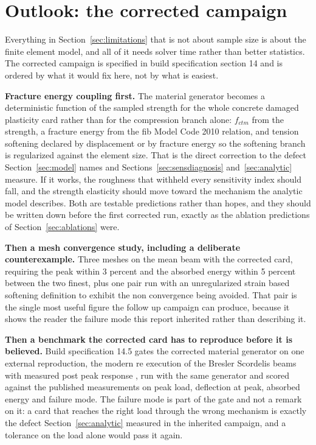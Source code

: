 \documentclass[11pt,a4paper]{article}
\begin{document}
\section{Outlook: the corrected campaign}
\label{sec:outlook}
Everything in Section~\ref{sec:limitations} that is not about sample size is about the finite
element model, and all of it needs solver time rather than better statistics. The corrected
campaign is specified in build specification section 14 and is ordered by what it would fix
here, not by what is easiest.

\textbf{Fracture energy coupling first.} The material generator becomes a deterministic function
of the sampled strength for the whole concrete damaged plasticity card rather than for the
compression branch alone: $f_{ctm}$ from the strength, a fracture energy from the fib Model Code
2010 relation, and tension softening declared by displacement or by fracture energy so the
softening branch is regularized against the element size. That is the direct correction to the
defect Section~\ref{sec:model} names and Sections~\ref{sec:sensdiagnosis}
and~\ref{sec:analytic} measure. If it works, the roughness that withheld every sensitivity index
should fall, and the strength elasticity should move toward the mechanism the analytic model
describes. Both are testable predictions rather than hopes, and they should be written down
before the first corrected run, exactly as the ablation predictions of
Section~\ref{sec:ablations} were.

\textbf{Then a mesh convergence study, including a deliberate counterexample.} Three meshes on
the mean beam with the corrected card, requiring the peak within 3 percent and the absorbed
energy within 5 percent between the two finest, plus one pair run with an unregularized strain
based softening definition to exhibit the non convergence being avoided. That pair is the single
most useful figure the follow up campaign can produce, because it shows the reader the failure
mode this report inherited rather than describing it.

\textbf{Then a benchmark the corrected card has to reproduce before it is believed.} Build
specification 14.5 gates the corrected material generator on one external reproduction, the
modern re execution of the Bresler Scordelis beams with measured post peak response
\cite{vecchio2004}, run with the same generator and scored against the published measurements
on peak load, deflection at peak, absorbed energy and failure mode. The failure mode is part of
the gate and not a remark on it: a card that reaches the right load through the wrong mechanism
is exactly the defect Section~\ref{sec:analytic} measured in the inherited campaign, and a
tolerance on the load alone would pass it again.
\end{document}
